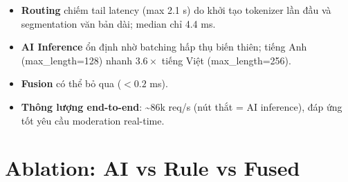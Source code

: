 \documentclass[11pt,a4paper]{article}
\begin{document}
\begin{table}[H]
    \centering
    \caption{Phân rã độ trễ mỗi yêu cầu (ms) trên 1000 mẫu}
    \label{tab:latency}
\end{table}

\begin{itemize}
    \item \textbf{Routing} chiếm tail latency (max 2.1 s) do khởi tạo tokenizer lần đầu và segmentation văn bản dài; median chỉ 4.4 ms.
    \item \textbf{AI Inference} ổn định nhờ batching hấp thụ biến thiên; tiếng Anh (max\_length=128) nhanh $3.6\times$ tiếng Việt (max\_length=256).
    \item \textbf{Fusion} có thể bỏ qua ($<0.2$ ms).
    \item \textbf{Thông lượng end-to-end}: \textasciitilde 86k req/s (nút thắt = AI inference), đáp ứng tốt yêu cầu moderation real-time.
\end{itemize}

\section{Ablation: AI vs Rule vs Fused}
\label{sec:ablation}
\end{document}
